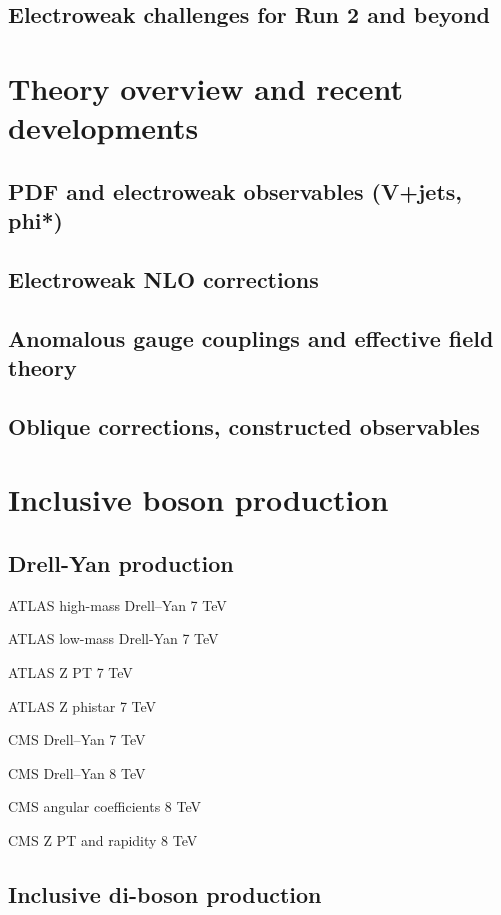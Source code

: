 \documentclass[12pt]{iopart}
\begin{document}
\subsection{Electroweak challenges for Run 2 and beyond}

\section{Theory overview and recent developments}
\subsection{PDF and electroweak observables (V+jets, phi*)}
\subsection{Electroweak NLO corrections}
\subsection{Anomalous gauge couplings and effective field theory}
\subsection{Oblique corrections, constructed observables}


\section{Inclusive boson production}
\subsection{Drell-Yan production}

ATLAS high-mass Drell--Yan 7 TeV~\cite{Aad:2013iua} 

ATLAS low-mass Drell-Yan 7 TeV~\cite{Aad:2014qja}

ATLAS Z PT 7 TeV~\cite{Aad:2014xaa}

ATLAS Z phistar 7 TeV~\cite{Aad:2012wfa}

CMS Drell--Yan 7 TeV~\cite{Chatrchyan:2013tia}

CMS Drell--Yan 8 TeV~\cite{CMS:2014jea}

CMS angular coefficients 8 TeV~\cite{Khachatryan:2015paa}

CMS Z PT and rapidity 8 TeV~\cite{Khachatryan:2015oaa}

\subsection{Inclusive di-boson production}
\end{document}
